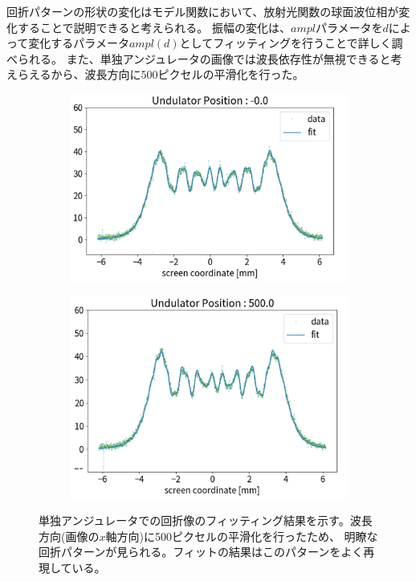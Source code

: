 \documentclass[a4paper,11pt,uplatex]{jsbook}
\begin{document}
回折パターンの形状の変化はモデル関数において、放射光関数の球面波位相が変化することで説明できると考えられる。
振幅の変化は、$ampl$パラメータを$d$によって変化するパラメータ$ampl(d)$としてフィッティングを行うことで詳しく調べられる。
また、単独アンジュレータの画像では波長依存性が無視できると考えらえるから、波長方向に$500$ピクセルの平滑化を行った。
\begin{figure}
  \centering
  \begin{subfigure}[h]{0.45\linewidth}
    \centering
    \includegraphics[width=\linewidth]{image/4-single_0.png}
  \end{subfigure}
  \hfill
  \begin{subfigure}[h]{0.45\linewidth}
    \centering
    \includegraphics[width=\linewidth]{image/4-single_500.png}
  \end{subfigure}
  \caption[単独アンジュレータのデータ]{単独アンジュレータでの回折像のフィッティング結果を示す。波長方向(画像の$x$軸方向)に500ピクセルの平滑化を行ったため、
  明瞭な回折パターンが見られる。フィットの結果はこのパターンをよく再現している。}
\end{figure}\label{single_d}
\end{document}
